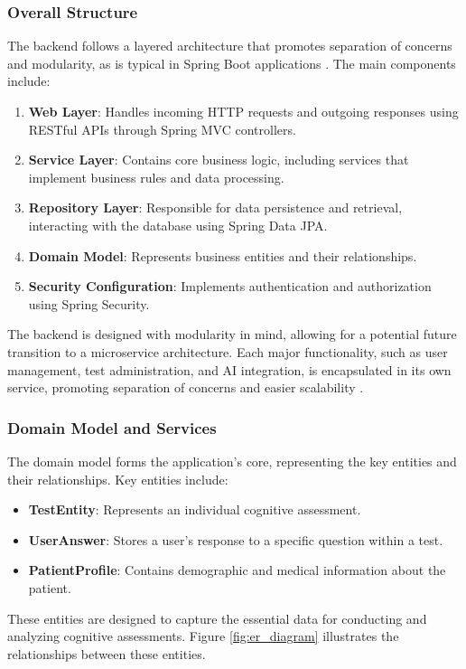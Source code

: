\subsubsection{Overall Structure}
The backend follows a layered architecture that promotes separation of concerns and modularity, as is typical in Spring Boot applications \cite{Walls2016}. The main components include:
\begin{enumerate}
\item \textbf{Web Layer}: Handles incoming HTTP requests and outgoing responses using RESTful APIs through Spring MVC controllers.
\item \textbf{Service Layer}: Contains core business logic, including services that implement business rules and data processing.
\item \textbf{Repository Layer}: Responsible for data persistence and retrieval, interacting with the database using Spring Data JPA.
\item \textbf{Domain Model}: Represents business entities and their relationships.
\item \textbf{Security Configuration}: Implements authentication and authorization using Spring Security.
\end{enumerate}
The backend is designed with modularity in mind, allowing for a potential future transition to a microservice architecture. Each major functionality, such as user management, test administration, and AI integration, is encapsulated in its own service, promoting separation of concerns and easier scalability \cite{Walls2016}.

\subsubsection{Domain Model and Services}
The domain model forms the application's core, representing the key entities and their relationships. Key entities include:
\begin{itemize}
    \item \textbf{TestEntity}: Represents an individual cognitive assessment.
    \item \textbf{UserAnswer}: Stores a user's response to a specific question within a test.
    \item \textbf{PatientProfile}: Contains demographic and medical information about the patient.
\end{itemize}

These entities are designed to capture the essential data for conducting and analyzing cognitive assessments. Figure \ref{fig:er_diagram} illustrates the relationships between these entities.


